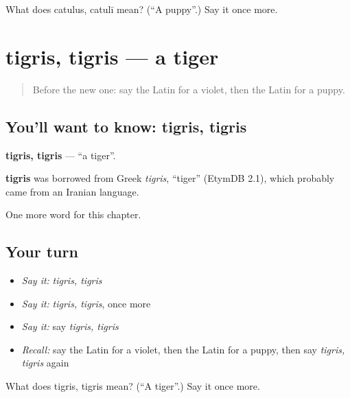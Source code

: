 \begin{tcolorbox}[breakable,colback=teal!4,colframe=teal!35!black,title={Before you move on}]
What does catulus, catulī mean? (\textquotedblleft{}A puppy\textquotedblright{}.) Say it once more.
\end{tcolorbox}
\section[tigris, tigris]{tigris, tigris — a tiger}

\label{lesson:LA-C251-tigris}



\begin{quote}
Before the new one: say the Latin for a violet, then the Latin for a puppy.
\end{quote}

\subsection*{You'll want to know: tigris, tigris}
\textbf{tigris, tigris} — \textquotedblleft{}a tiger\textquotedblright{}.

\begin{cousinweb}
\textbf{tigris} was borrowed from Greek \emph{tigris}, \textquotedblleft{}tiger\textquotedblright{} (EtymDB 2.1), which probably came from an Iranian language.
\end{cousinweb}

\begin{grammarlens}[title={What you've built}]
One more word for this chapter.
\end{grammarlens}

\subsection*{Your turn}
\begin{itemize}
\raggedright
  \item \emph{Say it:} \emph{tigris, tigris}
  \item \emph{Say it:} \emph{tigris, tigris}, once more
  \item \emph{Say it:} say \emph{tigris, tigris}
  \item \emph{Recall:} say the Latin for a violet, then the Latin for a puppy, then say \emph{tigris, tigris} again
\end{itemize}

\begin{tcolorbox}[breakable,colback=teal!4,colframe=teal!35!black,title={Before you move on}]
What does tigris, tigris mean? (\textquotedblleft{}A tiger\textquotedblright{}.) Say it once more.
\end{tcolorbox}

